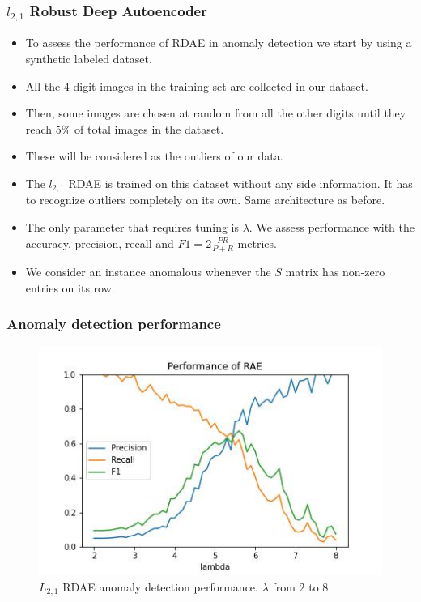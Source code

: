 \documentclass{beamer}
\theoremstyle{plain}
\theoremstyle{definition}
\theoremstyle{remark}
\begin{document}
\begin{frame}
	\frametitle{$l_{2,1}$ Robust Deep Autoencoder}
	\begin{itemize}
		\item To assess the performance of RDAE in anomaly detection we start by using a synthetic labeled dataset.
		\item All the $4$ digit images in the training set are collected in our dataset.
		\item Then, some images are chosen at random from all the other digits until they reach $5\%$ of total images in the dataset.
		\item These will be considered as the outliers of our data.
	\end{itemize}
\end{frame}


\begin{frame}
	\begin{itemize}
		\item The $l_{2,1}$ RDAE is trained on this dataset without any side information. It has to recognize outliers completely on its own. Same architecture as before.
		\item The only parameter that requires tuning is $\lambda$. We assess performance with the accuracy, precision, recall and $F1=2\frac{PR}{P+R}$ metrics.
		\item We consider an instance anomalous whenever the $S$ matrix has non-zero entries on its row.
	\end{itemize}
\end{frame}

\begin{frame}
	\frametitle{Anomaly detection performance}
	\begin{figure}
		\centering
		\includegraphics[width=0.8\linewidth]{Images/l21_experiment_from_0.1_to_10.1.jpg}
		\caption[]{$L_{2,1}$ RDAE anomaly detection performance. $\lambda$ from $2$ to $8$}
	\end{figure}
\end{frame}
\end{document}
